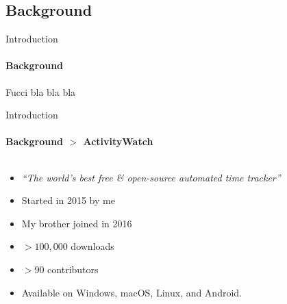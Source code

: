 \documentclass[xcolor={dvipsnames,table},12pt]{beamer}
\newif\ifplacelogo{}  %
\begin{document}
\subsection{Background}
\begin{frame}{Introduction}
    \framesubtitle{Background}

    Fucci bla bla bla
\end{frame}

\placelogofalse{}
\begin{frame}{Introduction}
    \framesubtitle{Background $>$ ActivityWatch}

    \begin{columns}
        \begin{column}{0.5\textwidth}
            \vspace{1em}

            \begin{itemize}
                \item{\emph{``The world's best free \& open-source automated time tracker''}}
                \item Started in 2015 by me
                \item My brother joined in 2016
                \item $>100{,}000$ downloads
                \item $>90$ contributors
                \item Available on Windows, macOS, Linux, and Android.
            \end{itemize}


\end{column}
\end{columns}
\end{frame}
\end{document}
